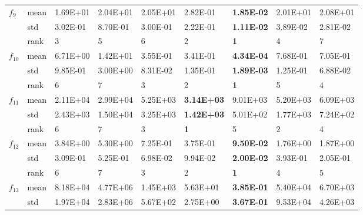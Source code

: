 \documentclass[a4paper,13pt,2p]{report}
\begin{document}
\begin{table}[!t]
{\begin{tabular}{|l|l|l|l|l|l|l|l|l|}
                     \multirow{3}{*}{$f_9$}  & mean & 1.69E+01 & 2.04E+01 & 2.05E+01 & 2.82E-01          & \textbf{1.85E-02}  & 2.01E+01 & 2.08E+01          \\ \cline{2-9} 
                     & std  & 3.02E-01 & 8.70E-01 & 3.00E-01 & 2.22E-01          & \textbf{1.11E-02}  & 3.89E-02 & 2.81E-02          \\ \cline{2-9} 
                     & rank & 3        & 5        & 6        & 2                 & \textbf{1}         & 4        & 7                 \\ \hline
\multirow{3}{*}{$f_{10}$} & mean & 6.71E+00 & 1.42E+01 & 3.55E-01 & 3.41E-01          & \textbf{4.34E-04}  & 7.68E-01 & 7.05E-01          \\ \cline{2-9} 
                     & std  & 9.85E-01 & 3.00E+00 & 8.31E-02 & 1.35E-01          & \textbf{1.89E-03}  & 1.25E-01 & 6.88E-02          \\ \cline{2-9} 
                     & rank & 6        & 7        & 3        & 2                 & \textbf{1}         & 5        & 4                 \\ \hline
\multirow{3}{*}{$f_{11}$} & mean & 2.11E+04 & 2.99E+04 & 5.25E+03 & \textbf{3.14E+03} & 9.01E+03           & 5.20E+03 & 6.09E+03          \\ \cline{2-9} 
                     & std  & 2.43E+03 & 1.50E+04 & 3.25E+03 & \textbf{1.42E+03} & 5.01E+02           & 1.77E+03 & 7.24E+02          \\ \cline{2-9} 
                     & rank & 6        & 7        & 3        & \textbf{1}        & 5                  & 2        & 4                 \\ \hline
\multirow{3}{*}{$f_{12}$} & mean & 3.84E+00 & 5.30E+00 & 7.25E-01 & 3.75E-01          & \textbf{9.50E-02}  & 1.76E+00 & 1.87E+00          \\ \cline{2-9} 
                     & std  & 3.09E-01 & 5.25E-01 & 6.98E-02 & 9.94E-02          & \textbf{2.00E-02}  & 3.93E-01 & 2.05E-01          \\ \cline{2-9} 
                     & rank & 6        & 7        & 3        & 2                 & \textbf{1}         & 4        & 5                 \\ \hline
\multirow{3}{*}{$f_{13}$} & mean & 8.18E+04 & 4.77E+06 & 1.45E+03 & 5.63E+01          & \textbf{3.85E-01}  & 5.40E+04 & 6.70E+03          \\ \cline{2-9} 
                     & std  & 1.97E+04 & 2.83E+06 & 5.67E+02 & 2.75E+00          & \textbf{3.67E-01}  & 9.53E+04 & 4.26E+03          \\ \cline{2-9} 

\end{tabular}}
\end{table}
\end{document}
